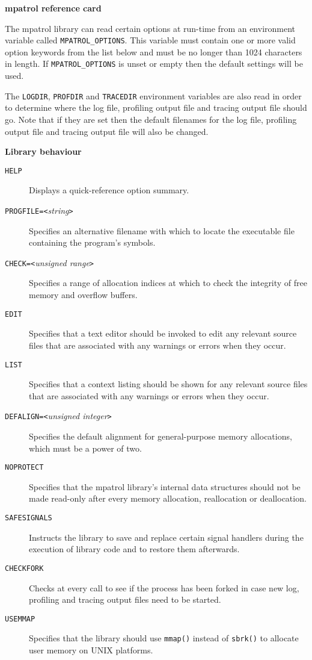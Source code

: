 \documentclass[a4paper,landscape,final]{article}
\newcommand{\heading}[1]{\textbf{\normalsize #1}}
\newcommand{\function}[1]{\texttt{#1()}}
\newcommand{\option}[1]{\texttt{#1}}
\newcommand{\optionpar}[2]{\option{#1}\texttt{=<}\textit{#2}\texttt{>}}
\begin{document}
\pagestyle{empty}

\footnotesize

\begin{multicols}{3}{\textbf{\Large mpatrol reference card}}

\vskip 12pt

The mpatrol library can read certain options at run-time from an environment
variable called \texttt{MPATROL\_OPTIONS}.  This variable must contain one or
more valid option keywords from the list below and must be no longer than 1024
characters in length.  If \texttt{MPATROL\_OPTIONS} is unset or empty then the
default settings will be used.

The \texttt{LOGDIR}, \texttt{PROFDIR} and \texttt{TRACEDIR} environment
variables are also read in order to determine where the log file, profiling
output file and tracing output file should go.  Note that if they are set then
the default filenames for the log file, profiling output file and tracing output
file will also be changed.

\vskip 12pt
\heading{Library behaviour}
\vskip 6pt

\begin{description}
\item[\option{HELP}]
Displays a quick-reference option summary.
\item[\optionpar{PROGFILE}{string}]
Specifies an alternative filename with which to locate the executable file
containing the program's symbols.
\item[\optionpar{CHECK}{unsigned range}]
Specifies a range of allocation indices at which to check the integrity of free
memory and overflow buffers.
\item[\option{EDIT}]
Specifies that a text editor should be invoked to edit any relevant source files
that are associated with any warnings or errors when they occur.
\item[\option{LIST}]
Specifies that a context listing should be shown for any relevant source files
that are associated with any warnings or errors when they occur.
\item[\optionpar{DEFALIGN}{unsigned integer}]
Specifies the default alignment for general-purpose memory allocations, which
must be a power of two.
\item[\option{NOPROTECT}]
Specifies that the mpatrol library's internal data structures should not be made
read-only after every memory allocation, reallocation or deallocation.
\item[\option{SAFESIGNALS}]
Instructs the library to save and replace certain signal handlers during the
execution of library code and to restore them afterwards.
\item[\option{CHECKFORK}]
Checks at every call to see if the process has been forked in case new log,
profiling and tracing output files need to be started.
\item[\option{USEMMAP}]
Specifies that the library should use \function{mmap} instead of \function{sbrk}
to allocate user memory on UNIX platforms.
\end{description}


\end{multicols}
\end{document}
